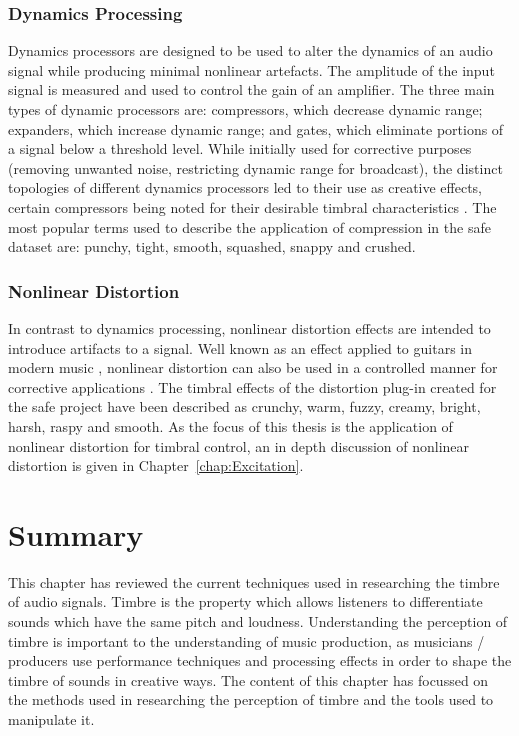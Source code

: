 		\subsubsection*{Dynamics Processing}
			Dynamics processors are designed to be used to alter the dynamics of an audio signal while
			producing minimal nonlinear artefacts. The amplitude of the input signal is measured and used to
			control the gain of an amplifier. The three main types of dynamic processors are: compressors,
			which decrease dynamic range; expanders, which increase dynamic range; and gates, which eliminate
			portions of a signal below a threshold level. While initially used for corrective purposes
			(removing unwanted noise, restricting dynamic range for broadcast), the distinct topologies of
			different dynamics processors led to their use as creative effects, certain compressors being noted
			for their desirable timbral characteristics \citep{moore2016an}. The most popular terms used to
			describe the application of compression in the \acrshort{safe} dataset are: punchy, tight, smooth,
			squashed, snappy and crushed.

		\subsubsection*{Nonlinear Distortion}
			In contrast to dynamics processing, nonlinear distortion effects are intended to introduce
			artifacts to a signal. Well known as an effect applied to guitars in modern music
			\citep{yeh2009digital}, nonlinear distortion can also be used in a controlled manner for corrective
			applications \citep{larsen2004audio}. The timbral effects of the distortion plug-in created for the
			\acrshort{safe} project have been described as crunchy, warm, fuzzy, creamy, bright, harsh, raspy
			and smooth. As the focus of this thesis is the application of nonlinear distortion for timbral
			control, an in depth discussion of nonlinear distortion is given in Chapter~\ref{chap:Excitation}. 

\section{Summary}
\label{sec:Timbre-Summary}
	This chapter has reviewed the current techniques used in researching the timbre of audio signals. Timbre is the
	property which allows listeners to differentiate sounds which have the same pitch and loudness. Understanding the
	perception of timbre is important to the understanding of music production, as musicians / producers use
	performance techniques and processing effects in order to shape the timbre of sounds in creative ways. The content
	of this chapter has focussed on the methods used in researching the perception of timbre and the tools used to
	manipulate it.
	
